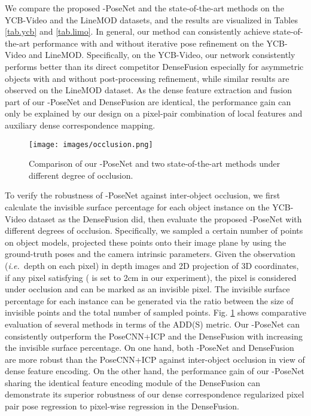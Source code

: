 \documentclass[letterpaper, 10 pt, conference]{ieeeconf}
\def\ie{\emph{i.e.~}} \def\Ie{\emph{I.e.}~}
\begin{document}
We compare the proposed -PoseNet and the state-of-the-art methods on the YCB-Video and the LineMOD  datasets, and the results are visualized in Tables \ref{tab.ycb} and \ref{tab.limo}. 
In general, our method can consistently achieve state-of-the-art performance with and without iterative pose refinement on the YCB-Video and LineMOD.
Specifically, on the YCB-Video, our network consistently performs better than its direct competitor DenseFusion especially for asymmetric objects with and without post-processing refinement, while similar results are observed on the LineMOD dataset.
As the dense feature extraction and fusion part of our -PoseNet and DenseFusion are identical, the performance gain can only be explained by our design on a pixel-pair combination of local features and auxiliary dense correspondence mapping. 


\begin{figure}[h]
\centering
\texttt{[image: images/occlusion.png]}
\caption{Comparison of our -PoseNet and two state-of-the-art methods under different degree of occlusion.}
\label{fig:occlusion}\vspace{-0.3cm}
\end{figure}

To verify the robustness of -PoseNet against inter-object occlusion, we first calculate the invisible surface percentage for each object instance {on the YCB-Video dataset} as the DenseFusion \cite{wang2019densefusion} did, then evaluate the proposed -PoseNet with different degrees of occlusion.
Specifically, we sampled a certain number of points on object models, projected these points onto their image plane by using the ground-truth poses and the camera intrinsic parameters. 
Given the observation (\ie depth  on each pixel) in depth images and 2D projection  of 3D coordinates, if any pixel satisfying  ( is set to 2cm in our experiment), the pixel is considered under occlusion and can be marked as an invisible pixel. 
The invisible surface percentage for each instance can be generated via the ratio between the size of invisible points and the total number of sampled points.
Fig. \ref{fig:occlusion} shows comparative evaluation of several methods in terms of the ADD(S) metric.
Our -PoseNet can consistently outperform the PoseCNN+ICP \cite{xiang2017posecnn} and the DenseFusion \cite{wang2019densefusion} with increasing the invisible surface percentage. 
On one hand, both -PoseNet and DenseFusion are more robust than the PoseCNN+ICP against inter-object occlusion in view of dense feature encoding.
On the other hand, the performance gain of our -PoseNet sharing the identical feature encoding module of the DenseFusion can demonstrate its superior robustness of our dense correspondence regularized pixel pair pose regression to pixel-wise regression in the DenseFusion.  
\end{document}
